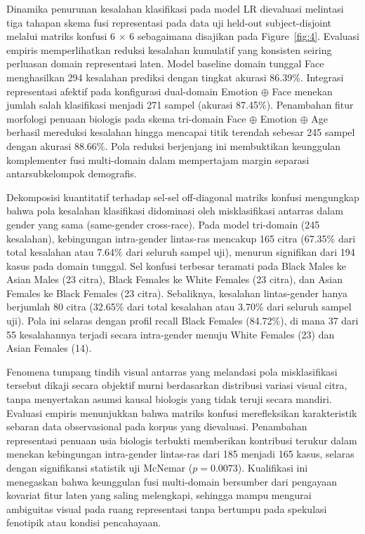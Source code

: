 Dinamika penurunan kesalahan klasifikasi pada model LR dievaluasi melintasi tiga tahapan skema fusi representasi pada data uji held-out subject-disjoint melalui matriks konfusi 6 $\times$ 6 sebagaimana disajikan pada Figure~\ref{fig:4}. Evaluasi empiris memperlihatkan reduksi kesalahan kumulatif yang konsisten seiring perluasan domain representasi laten. Model baseline domain tunggal Face menghasilkan 294 kesalahan prediksi dengan tingkat akurasi 86.39\%. Integrasi representasi afektif pada konfigurasi dual-domain Emotion $\oplus$ Face menekan jumlah salah klasifikasi menjadi 271 sampel (akurasi 87.45\%). Penambahan fitur morfologi penuaan biologis pada skema tri-domain Face $\oplus$ Emotion $\oplus$ Age berhasil mereduksi kesalahan hingga mencapai titik terendah sebesar 245 sampel dengan akurasi 88.66\%. Pola reduksi berjenjang ini membuktikan keunggulan komplementer fusi multi-domain dalam mempertajam margin separasi antarsubkelompok demografis.

Dekomposisi kuantitatif terhadap sel-sel off-diagonal matriks konfusi mengungkap bahwa pola kesalahan klasifikasi didominasi oleh misklasifikasi antarras dalam gender yang sama (same-gender cross-race). Pada model tri-domain (245 kesalahan), kebingungan intra-gender lintas-ras mencakup 165 citra (67.35\% dari total kesalahan atau 7.64\% dari seluruh sampel uji), menurun signifikan dari 194 kasus pada domain tunggal. Sel konfusi terbesar teramati pada Black Males ke Asian Males (23 citra), Black Females ke White Females (23 citra), dan Asian Females ke Black Females (23 citra). Sebaliknya, kesalahan lintas-gender hanya berjumlah 80 citra (32.65\% dari total kesalahan atau 3.70\% dari seluruh sampel uji). Pola ini selaras dengan profil recall Black Females (84.72\%), di mana 37 dari 55 kesalahannya terjadi secara intra-gender menuju White Females (23) dan Asian Females (14).

Fenomena tumpang tindih visual antarras yang melandasi pola misklasifikasi tersebut dikaji secara objektif murni berdasarkan distribusi variasi visual citra, tanpa menyertakan asumsi kausal biologis yang tidak teruji secara mandiri. Evaluasi empiris menunjukkan bahwa matriks konfusi merefleksikan karakteristik sebaran data observasional pada korpus yang dievaluasi. Penambahan representasi penuaan usia biologis terbukti memberikan kontribusi terukur dalam menekan kebingungan intra-gender lintas-ras dari 185 menjadi 165 kasus, selaras dengan signifikansi statistik uji McNemar ($p = 0.0073$). Kualifikasi ini menegaskan bahwa keunggulan fusi multi-domain bersumber dari pengayaan kovariat fitur laten yang saling melengkapi, sehingga mampu mengurai ambiguitas visual pada ruang representasi tanpa bertumpu pada spekulasi fenotipik atau kondisi pencahayaan.
